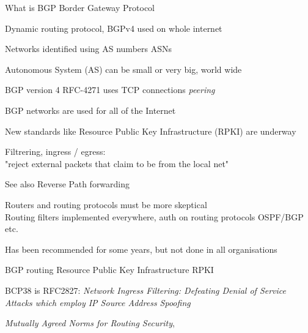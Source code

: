 \documentclass[Screen16to9,17pt]{foils}
\begin{document}
\begin{list1}
\item What is BGP Border Gateway Protocol
\item Dynamic routing protocol, BGPv4 used on whole internet
\item Networks identified using AS numbers ASNs
\item Autonomous System (AS) can be small or very big, world wide
\item BGP version 4 RFC-4271 uses TCP connections
\emph{peering}
\item {}
\end{list1}




\begin{list2}
\item BGP networks are used for all of the Internet
\item New standards like Resource Public Key Infrastructure (RPKI) are underway
\end{list2}


\begin{list2}
\item Filtrering, ingress / egress:\\
"reject external packets that claim to be from the local net"
\item See also Reverse Path forwarding 
\item Routers and routing protocols must be more skeptical\\
Routing filters implemented everywhere, auth on routing protocols OSPF/BGP etc.
\item Has been recommended for some years, but not done in all organisations
\item BGP routing Resource Public Key Infrastructure RPKI
\item BCP38 is RFC2827: \emph{Network Ingress Filtering: Defeating Denial of Service Attacks which employ IP Source Address Spoofing}\\
\item \emph{Mutually Agreed Norms for Routing Security}, 
\end{list2}
\end{document}
